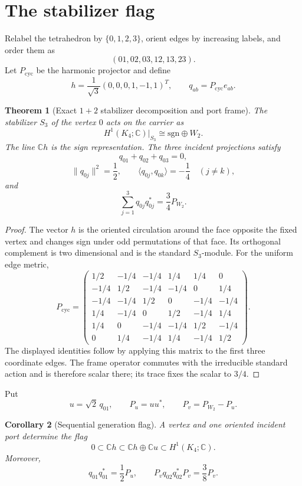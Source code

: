 \documentclass[11pt,oneside,openany]{book}
\numberwithin{equation}{chapter}
\newtheorem{theorem}{Theorem}[chapter]
\newtheorem{corollary}[theorem]{Corollary}
\theoremstyle{definition}
\theoremstyle{remark}
\newcommand{\C}{\mathbb C}
\newcommand{\norm}[1]{\lVert #1\rVert}
\newcommand{\ip}[2]{\langle #1,#2\rangle}
\newcommand{\sgnrep}{\mathrm{sgn}}
\newcommand{\Pcyc}{P_{\mathrm{cyc}}}
\begin{document}
\section{The stabilizer flag}

Relabel the tetrahedron by \(\{0,1,2,3\}\), orient edges by increasing labels,
and order them as
\[
 (01,02,03,12,13,23).
\]
Let \(\Pcyc\) be the harmonic projector and define
\[
 h=\frac1{\sqrt3}(0,0,0,1,-1,1)^T,
 \qquad
 q_{ab}=\Pcyc e_{ab}.
\]

\begin{theorem}[Exact \(1+2\) stabilizer decomposition and port frame]
\label{thm:stabilizer-port-frame}
The stabilizer \(S_3\) of the vertex \(0\) acts on the carrier as
\[
 \boxed{H^1(K_4;\C)|_{S_3}\cong\sgnrep\oplus W_2.}
\]
The line \(\C h\) is the sign representation.  The three incident
projections satisfy
\[
 q_{01}+q_{02}+q_{03}=0,
\]
\[
 \norm{q_{0j}}^2=\frac12,
 \qquad
 \ip{q_{0j}}{q_{0k}}=-\frac14\quad(j\neq k),
\]
and
\[
 \boxed{
 \sum_{j=1}^3q_{0j}q_{0j}^*
 =\frac34P_{W_2}.}
\]
\end{theorem}

\begin{proof}
The vector \(h\) is the oriented circulation around the face opposite the
fixed vertex and changes sign under odd permutations of that face.
Its orthogonal complement is two dimensional and is the standard
\(S_3\)-module.  For the uniform edge metric,
\[
 \Pcyc=
 \begin{pmatrix}
 1/2&-1/4&-1/4& 1/4& 1/4&0\\
 -1/4&1/2&-1/4&-1/4&0&1/4\\
 -1/4&-1/4&1/2&0&-1/4&-1/4\\
 1/4&-1/4&0&1/2&-1/4&1/4\\
 1/4&0&-1/4&-1/4&1/2&-1/4\\
 0&1/4&-1/4&1/4&-1/4&1/2
 \end{pmatrix}.
\]
The displayed identities follow by applying this matrix to the first three
coordinate edges.  The frame operator commutes with the irreducible standard
action and is therefore scalar there; its trace fixes the scalar to \(3/4\).
\end{proof}

Put
\[
 u=\sqrt2\,q_{01},
 \qquad
 P_u=uu^*,
 \qquad
 P_v=P_{W_2}-P_u.
\]

\begin{corollary}[Sequential generation flag]
\label{cor:sequential-flag}
A vertex and one oriented incident port determine the flag
\[
 \boxed{
 0\subset\C h\subset\C h\oplus\C u
 \subset H^1(K_4;\C).}
\]
Moreover,
\[
 q_{01}q_{01}^*=\frac12P_u,
 \qquad
 P_vq_{02}q_{02}^*P_v=\frac38P_v.
\]
\end{corollary}
\end{document}
